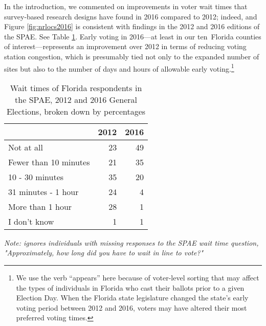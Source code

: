 \documentclass[12pt,titlepage]{article}
\newcommand{\numcounties}{ten}
\begin{document}
In the introduction, we commented on improvements in voter wait times
that survey-based research designs have found in 2016 compared to
2012; indeed, and Figure \ref{fig:nrlocs2016} is consistent with
findings in the 2012 \citep{spae2012} and 2016 \citep{spae2016}
editions of the SPAE.  See Table \ref{tab:floridaspae}.  Early voting
in 2016---at least in our \numcounties\ Florida counties of
interest---represents an improvement over 2012 in terms of reducing
voting station congestion, which is presumably tied not only to the
expanded number of sites but also to the number of days and hours of
allowable early voting.\footnote{We use the verb ``appears'' here
  because of voter-level sorting that may affect the types of
  individuals in Florida who cast their ballots prior to a given
  Election Day.  When the Florida state legislature changed the
  state's early voting period between 2012 and 2016, voters may have
  altered their most preferred voting times.}

\begin{table}[ht]
\centering
\caption{Wait times of Florida respondents in the SPAE, 2012 and 2016
  General Elections, broken down by percentages} 
\label{tab:floridaspae}
\begin{tabular}{lrr}
  \hline
 & 2012 & 2016 \\ 
  \hline
  Not at all &  23 &  49 \\ 
  Fewer than 10 minutes &  21 &  35 \\ 
  10 - 30 minutes &  35 &  20 \\ 
  31 minutes - 1 hour &  24 &   4 \\ 
  More than 1 hour &  28 &   1 \\ 
  I don't know &   1 &   1 \\ 
   \hline
\end{tabular}
\begin{flushleft}
  \emph{Note: ignores individuals with missing responses to the SPAE
    wait time question, "Approximately, how long did you have to wait
    in line to vote?"}
\end{flushleft}
\end{table}

% 
\end{document}
